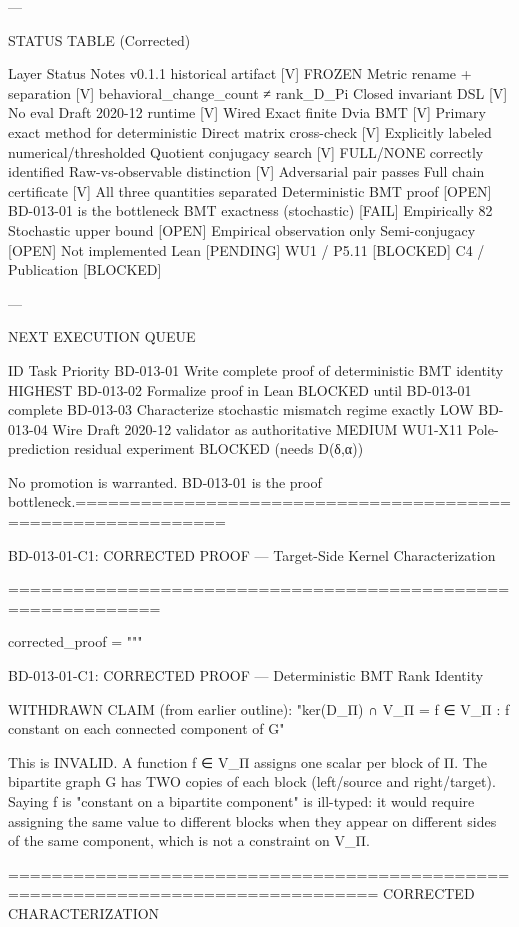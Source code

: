 ---

STATUS TABLE (Corrected)

Layer	Status	Notes	
v0.1.1 historical artifact	[V] FROZEN		
Metric rename + separation	[V]	behavioral_change_count ≠ rank_D_Pi	
Closed invariant DSL	[V]	No eval	
Draft 2020-12 runtime	[V]	Wired	
Exact finite D\Pi via BMT	[V]	Primary exact method for deterministic	
Direct matrix cross-check	[V]	Explicitly labeled numerical/thresholded	
Quotient conjugacy search	[V]	FULL/NONE correctly identified	
Raw-vs-observable distinction	[V]	Adversarial pair passes	
Full chain certificate	[V]	All three quantities separated	
Deterministic BMT proof	[OPEN]	BD-013-01 is the bottleneck	
BMT exactness (stochastic)	[FAIL]	Empirically 82%
Stochastic upper bound	[OPEN]	Empirical observation only	
Semi-conjugacy	[OPEN]	Not implemented	
Lean	[PENDING]		
WU1 / P5.11	[BLOCKED]		
C4 / Publication	[BLOCKED]


---

NEXT EXECUTION QUEUE

ID	Task	Priority	
BD-013-01	Write complete proof of deterministic BMT identity	HIGHEST	
BD-013-02	Formalize proof in Lean	BLOCKED until BD-013-01 complete	
BD-013-03	Characterize stochastic mismatch regime exactly	LOW	
BD-013-04	Wire Draft 2020-12 validator as authoritative	MEDIUM	
WU1-X11	Pole-prediction residual experiment	BLOCKED (needs D(δ,α))

No promotion is warranted. BD-013-01 is the proof bottleneck.============================================================

BD-013-01-C1: CORRECTED PROOF — Target-Side Kernel Characterization

============================================================

corrected_proof = """

BD-013-01-C1: CORRECTED PROOF — Deterministic BMT Rank Identity

WITHDRAWN CLAIM (from earlier outline):
"ker(D_Π) ∩ V_Π = {f ∈ V_Π : f constant on each connected component of G}"

This is INVALID. A function f ∈ V_Π assigns one scalar per block of Π.
The bipartite graph G has TWO copies of each block (left/source and right/target).
Saying f is "constant on a bipartite component" is ill-typed: it would require
assigning the same value to different blocks when they appear on different sides
of the same component, which is not a constraint on V_Π.

================================================================================
CORRECTED CHARACTERIZATION

